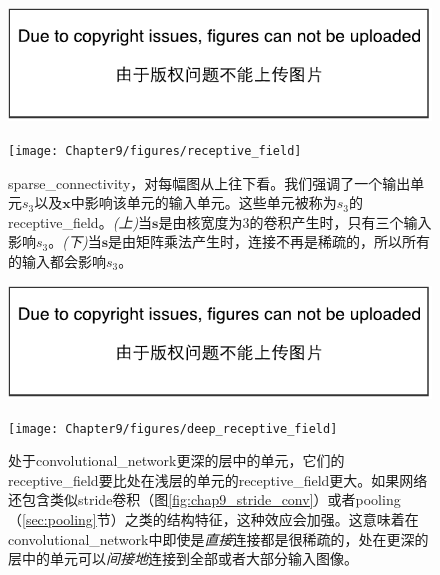 \begin{figure}[!htb]
\ifOpenSource
\centerline{\includegraphics{figure.pdf}}
\else
\centerline{\texttt{[image: Chapter9/figures/receptive\_field]}}
\fi
\captionsetup{singlelinecheck=off}
\caption[.]{\gls{sparse_connectivity}，对每幅图从上往下看。我们强调了一个输出单元$s_3$以及$\bm{x}$中影响该单元的输入单元。这些单元被称为$s_3$的\gls{receptive_field}。\emph{(上)}当$\bm{s}$是由核宽度为3的卷积产生时，只有三个输入影响$s_3$。\emph{(下)}当$\bm{s}$是由矩阵乘法产生时，连接不再是稀疏的，所以所有的输入都会影响$s_3$。}
\label{fig:chap9_receptive_field}
\end{figure}
\begin{figure}[!htb]
\ifOpenSource
\centerline{\includegraphics{figure.pdf}}
\else
\centerline{\texttt{[image: Chapter9/figures/deep\_receptive\_field]}}
\fi
\caption{处于\gls{convolutional_network}更深的层中的单元，它们的\gls{receptive_field}要比处在浅层的单元的\gls{receptive_field}更大。如果网络还包含类似\gls{stride}卷积（图\ref{fig:chap9_stride_conv}）或者\gls{pooling}（\ref{sec:pooling}节）之类的结构特征，这种效应会加强。这意味着在\gls{convolutional_network}中即使是\emph{直接}连接都是很稀疏的，处在更深的层中的单元可以\emph{间接地}连接到全部或者大部分输入图像。}
\label{fig:chap9_deep_receptive_field}
\end{figure}

 
